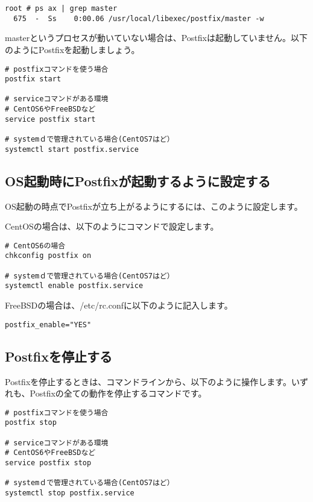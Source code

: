 \begin{verbatim}
root # ps ax | grep master
  675  -  Ss    0:00.06 /usr/local/libexec/postfix/master -w
\end{verbatim}


masterというプロセスが動いていない場合は、Postfixは起動していません。以下のようにPostfixを起動しましょう。

\begin{verbatim}
# postfixコマンドを使う場合
postfix start

# serviceコマンドがある環境
# CentOS6やFreeBSDなど
service postfix start

# systemｄで管理されている場合(CentOS7はど）
systemctl start postfix.service
\end{verbatim}

\subsection{OS起動時にPostfixが起動するように設定する}

OS起動の時点でPostfixが立ち上がるようにするには、このように設定します。

CentOSの場合は、以下のようにコマンドで設定します。

\begin{verbatim}
# CentOS6の場合
chkconfig postfix on

# systemｄで管理されている場合(CentOS7はど）
systemctl enable postfix.service
\end{verbatim}

FreeBSDの場合は、/etc/rc.confに以下のように記入します。

\begin{lstlisting}[basicstyle=\ttfamily\footnotesize, frame=single]
postfix_enable="YES"
\end{lstlisting}

\subsection{Postfixを停止する}
Postfixを停止するときは、コマンドラインから、以下のように操作します。いずれも、Postfixの全ての動作を停止するコマンドです。

\begin{verbatim}
# postfixコマンドを使う場合
postfix stop

# serviceコマンドがある環境
# CentOS6やFreeBSDなど
service postfix stop

# systemｄで管理されている場合(CentOS7はど）
systemctl stop postfix.service
\end{verbatim}




